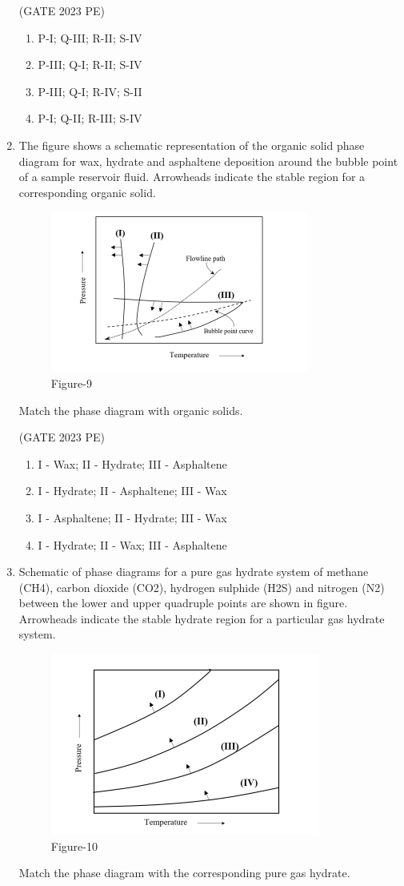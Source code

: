 \documentclass[journal,12pt,onecolumn]{exam}
\theoremstyle{remark}
\begin{document}
\begin{enumerate}
\hfill{(GATE 2023 PE)}\\
\begin{enumerate}
    \item P-I; Q-III; R-II; S-IV
    \item P-III; Q-I; R-II; S-IV
    \item P-III; Q-I; R-IV; S-II
    \item P-I; Q-II; R-III; S-IV
\end{enumerate}
\item The figure shows a schematic representation of the organic solid phase diagram
for wax, hydrate and asphaltene deposition around the bubble point of a sample
reservoir fluid. Arrowheads indicate the stable region for a corresponding organic
solid.
\begin{figure}[H]
    \centering
    \includegraphics[width=0.5\linewidth]{figs/fig9.png}
    \caption{Figure-9}
    \label{fig:figs/fig9.png}
\end{figure}
Match the phase diagram with organic solids.

\hfill{(GATE 2023 PE)}\\
\begin{enumerate}
    \item I - Wax; II - Hydrate; III - Asphaltene
    \item I - Hydrate; II - Asphaltene; III - Wax
    \item I - Asphaltene; II - Hydrate; III - Wax
    \item I - Hydrate; II - Wax; III - Asphaltene
\end{enumerate}
\item Schematic of phase diagrams for a pure gas hydrate system of methane (CH4),
carbon dioxide (CO2), hydrogen sulphide (H2S) and nitrogen (N2) between the
lower and upper quadruple points are shown in figure. Arrowheads indicate the
stable hydrate region for a particular gas hydrate system.
\begin{figure}[H]
    \centering
    \includegraphics[width=0.5\linewidth]{figs/fig10.png}
    \caption{Figure-10}
    \label{fig:figs/fig10.png}
\end{figure}
Match the phase diagram with the corresponding pure gas hydrate.


\end{enumerate}
\end{document}
